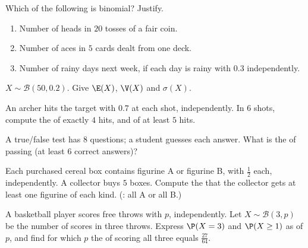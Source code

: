 \begin{exercise}[$\star$]\label{exo:g11:binom:3}
Which of the following is binomial? Justify.
\begin{enumerate}
  \item Number of heads in $20$ tosses of a fair coin.
  \item Number of aces in $5$ cards dealt from one deck.
  \item Number of rainy days next week, if each day is rainy with
         $0.3$ independently.
\end{enumerate}
\end{exercise}

\begin{exercise}[$\star$]\label{exo:g11:binom:4}
$X \sim \mathcal B(50, 0.2)$. Give $\E(X)$, $\V(X)$ and $\sigma(X)$.
\end{exercise}

\begin{exercise}[$\star\star$]\label{exo:g11:binom:5}
An archer hits the target with  $0.7$ at each shot,
independently. In $6$ shots, compute the  of exactly $4$ hits,
and of at least $5$ hits.
\end{exercise}

\begin{exercise}[$\star\star$]\label{exo:g11:binom:6}
A true/false test has $8$ questions; a student guesses each answer.
What is the  of passing (at least $6$ correct answers)?
\end{exercise}

\begin{exercise}[$\star\star$]\label{exo:g11:binom:7}
Each purchased cereal box contains figurine A or figurine B, with
 $\frac12$ each, independently. A collector buys $5$ boxes.
Compute the  that the collector gets at least one figurine of
each kind. (: all A or all B.)
\end{exercise}

\begin{exercise}[$\star\star$]\label{exo:g11:binom:8}
A basketball player scores free throws with  $p$,
independently. Let $X \sim \mathcal B(3, p)$ be the number of scores in
three throws. Express $\P(X = 3)$ and $\P(X \geq 1)$ as  of $p$,
and find for which $p$ the  of scoring all three equals
$\frac{27}{64}$.
\end{exercise}

